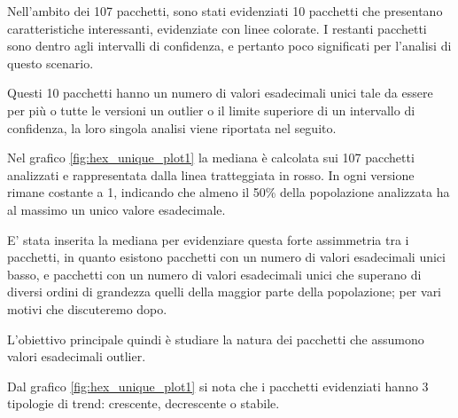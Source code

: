 Nell'ambito dei 107 pacchetti, 
sono stati evidenziati 10 pacchetti che presentano caratteristiche interessanti, 
evidenziate con linee colorate.
I restanti pacchetti sono dentro agli intervalli di confidenza, e pertanto poco significati per 
l'analisi di questo scenario.


Questi 10 pacchetti hanno un numero di valori esadecimali unici tale da 
essere per più o tutte le versioni un outlier o il limite superiore di un intervallo di confidenza,
la loro singola analisi viene riportata nel seguito.


Nel grafico \ref{fig:hex_unique_plot1} la mediana è
calcolata sui 107 pacchetti analizzati e rappresentata dalla linea tratteggiata in rosso. 
In ogni versione rimane costante a 1, indicando che almeno il 50\% della popolazione analizzata ha al massimo un unico valore esadecimale.


E' stata inserita la mediana per evidenziare questa forte assimmetria tra i pacchetti,
in quanto esistono pacchetti con un numero di valori esadecimali unici basso, e
pacchetti con un numero di valori esadecimali unici che superano di diversi ordini di grandezza
quelli della maggior parte della popolazione; per vari motivi che discuteremo dopo.


L'obiettivo principale quindi è studiare la natura dei pacchetti che assumono valori esadecimali outlier.

Dal grafico \ref{fig:hex_unique_plot1} si nota che i pacchetti evidenziati
hanno 3 tipologie di trend: crescente, decrescente o stabile.

